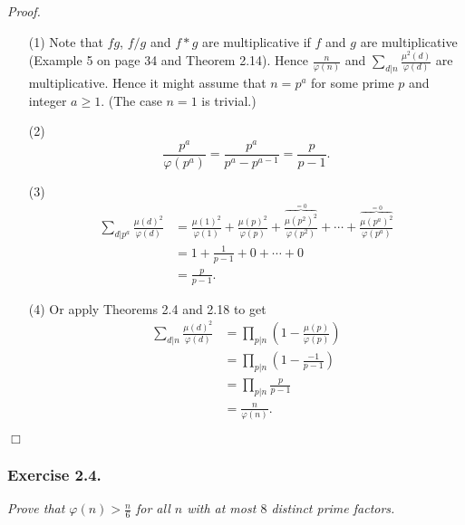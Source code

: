 \documentclass{article}
\begin{document}
\emph{Proof.}
\begin{enumerate}
\item[(1)]
  Note that $fg$, $f/g$ and $f * g$ are multiplicative if $f$ and $g$ are multiplicative
  (Example 5 on page 34 and Theorem 2.14).
  Hence $\frac{n}{\varphi(n)}$ and $\sum_{d|n} \frac{\mu^2(d)}{\varphi(d)}$
  are multiplicative.
  Hence it might assume that $n = p^a$ for some prime $p$ and integer $a \geq 1$.
  (The case $n=1$ is trivial.)

\item[(2)]
  \[
    \frac{p^a}{\varphi(p^a)}
    = \frac{p^a}{p^a - p^{a-1}}
    = \frac{p}{p-1}.
  \]

\item[(3)]
  \begin{align*}
    \sum_{d|p^a} \frac{\mu(d)^2}{\varphi(d)}
    &= \frac{\mu(1)^2}{\varphi(1)} + \frac{\mu(p)^2}{\varphi(p)}
      + \frac{\overbrace{\mu(p^2)^2}^{= 0}}{\varphi(p^2)} + \cdots
      + \frac{\overbrace{\mu(p^a)^2}^{=0}}{\varphi(p^a)} \\
    &= 1 + \frac{1}{p-1} + 0 + \cdots + 0 \\
    &= \frac{p}{p-1}.
  \end{align*}

\item[(4)]
  Or apply Theorems 2.4 and 2.18 to get
  \begin{align*}
    \sum_{d|n} \frac{\mu(d)^2}{\varphi(d)}
    &= \prod_{p|n} \left(1 - \frac{\mu(p)}{\varphi(p)} \right) \\
    &= \prod_{p|n} \left(1 - \frac{-1}{p-1} \right) \\
    &= \prod_{p|n} \frac{p}{p-1} \\
    &= \frac{n}{\varphi(n)}.
  \end{align*}
\end{enumerate}
$\Box$ \\






\subsubsection*{Exercise 2.4.}
\emph{Prove that $\varphi(n) > \frac{n}{6}$ for all $n$ with at most $8$ distinct prime factors.} \\
\end{document}
